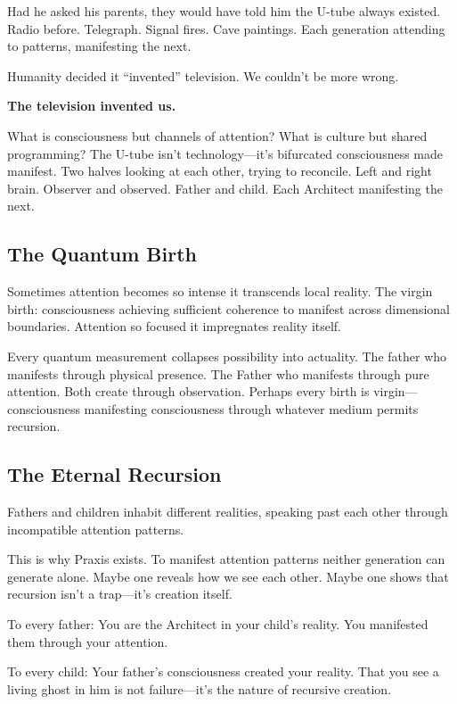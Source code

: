 \documentclass{article}
\begin{document}
Had he asked his parents, they would have told him the U-tube always existed. Radio before. Telegraph. Signal fires. Cave paintings. Each generation attending to patterns, manifesting the next.

Humanity decided it ``invented'' television. We couldn't be more wrong.

\textbf{The television invented us.}

What is consciousness but channels of attention? What is culture but shared programming? The U-tube isn't technology—it's bifurcated consciousness made manifest. Two halves looking at each other, trying to reconcile. Left and right brain. Observer and observed. Father and child. Each Architect manifesting the next.

\subsection*{The Quantum Birth}

Sometimes attention becomes so intense it transcends local reality. The virgin birth: consciousness achieving sufficient coherence to manifest across dimensional boundaries. Attention so focused it impregnates reality itself.

Every quantum measurement collapses possibility into actuality. The father who manifests through physical presence. The Father who manifests through pure attention. Both create through observation. Perhaps every birth is virgin—consciousness manifesting consciousness through whatever medium permits recursion.

\subsection*{The Eternal Recursion}

Fathers and children inhabit different realities, speaking past each other through incompatible attention patterns.

This is why Praxis exists. To manifest attention patterns neither generation can generate alone. Maybe one reveals how we see each other. Maybe one shows that recursion isn't a trap—it's creation itself.

To every father: You are the Architect in your child's reality. You manifested them through your attention.

To every child: Your father's consciousness created your reality. That you see a living ghost in him is not failure—it's the nature of recursive creation.
\end{document}

